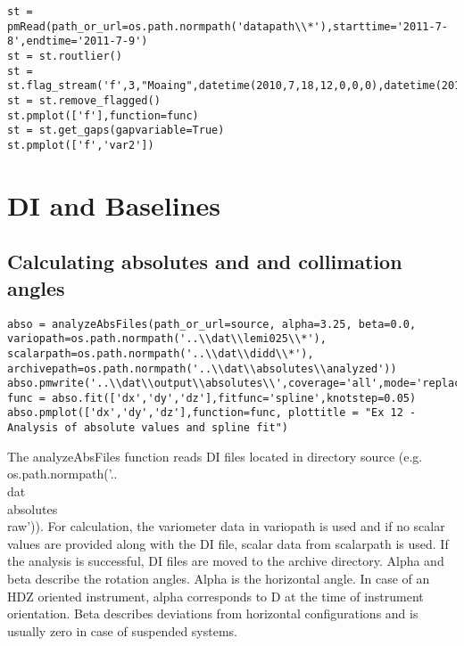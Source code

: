 \begin{verbatim}
st = pmRead(path_or_url=os.path.normpath('datapath\\*'),starttime='2011-7-8',endtime='2011-7-9')
st = st.routlier()
st = st.flag_stream('f',3,"Moaing",datetime(2010,7,18,12,0,0,0),datetime(2010,7,18,13,0,0,0))
st = st.remove_flagged()
st.pmplot(['f'],function=func)
st = st.get_gaps(gapvariable=True)
st.pmplot(['f','var2'])
\end{verbatim}


\section{DI and Baselines}

\subsection{Calculating absolutes and and collimation angles}

\begin{verbatim}
abso = analyzeAbsFiles(path_or_url=source, alpha=3.25, beta=0.0, variopath=os.path.normpath('..\\dat\\lemi025\\*'), scalarpath=os.path.normpath('..\\dat\\didd\\*'), archivepath=os.path.normpath('..\\dat\\absolutes\\analyzed'))
abso.pmwrite('..\\dat\\output\\absolutes\\',coverage='all',mode='replace',filenamebegins='absolutes_lemi')
func = abso.fit(['dx','dy','dz'],fitfunc='spline',knotstep=0.05)
abso.pmplot(['dx','dy','dz'],function=func, plottitle = "Ex 12 - Analysis of absolute values and spline fit")
\end{verbatim}
The analyzeAbsFiles function reads DI files located in directory source (e.g. os.path.normpath('..\\dat\\absolutes\\raw')). For calculation, the variometer data in variopath is used and if no scalar values are provided along with the DI file, scalar data from scalarpath is used. If the analysis is successful, DI files are moved to the archive directory. Alpha and beta describe the rotation angles. Alpha is the horizontal angle. In case of an HDZ oriented instrument, alpha corresponds to D at the time of instrument orientation. Beta describes deviations from horizontal configurations and is usually zero in case of suspended systems.

